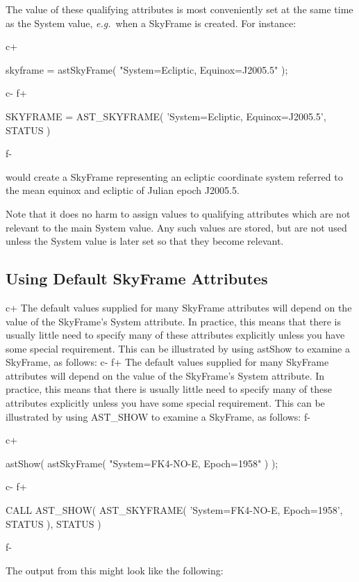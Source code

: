 \documentclass[twoside,11pt]{starlink}
\begin{document}
The value of these qualifying attributes is most conveniently set at
the same time as the System value, \emph{e.g.}\ when a SkyFrame is
created. For instance:

c+
\small
\begin{terminalv}
skyframe = astSkyFrame( "System=Ecliptic, Equinox=J2005.5" );
\end{terminalv}
\normalsize
c-
f+
\small
\begin{terminalv}
      SKYFRAME = AST_SKYFRAME( 'System=Ecliptic, Equinox=J2005.5', STATUS )
\end{terminalv}
\normalsize
f-

would create a SkyFrame representing an ecliptic coordinate system
referred to the mean equinox and ecliptic of Julian epoch J2005.5.

Note that it does no harm to assign values to qualifying attributes
which are not relevant to the main System value. Any such values are
stored, but are not used unless the System value is later set so that
they become relevant.

\subsection{Using Default SkyFrame Attributes}

c+
The default values supplied for many SkyFrame attributes will depend
on the value of the SkyFrame's System attribute. In practice, this
means that there is usually little need to specify many of these
attributes explicitly unless you have some special requirement. This
can be illustrated by using astShow to examine a SkyFrame, as follows:
c-
f+
The default values supplied for many SkyFrame attributes will depend
on the value of the SkyFrame's System attribute. In practice, this
means that there is usually little need to specify many of these
attributes explicitly unless you have some special requirement. This
can be illustrated by using AST\_SHOW to examine a SkyFrame, as
follows:
f-

c+
\small
\begin{terminalv}
astShow( astSkyFrame( "System=FK4-NO-E, Epoch=1958" ) );
\end{terminalv}
\normalsize
c-
f+
\small
\begin{terminalv}
      CALL AST_SHOW( AST_SKYFRAME( 'System=FK4-NO-E, Epoch=1958', STATUS ), STATUS )
\end{terminalv}
\normalsize
f-

The output from this might look like the following:
\end{document}
